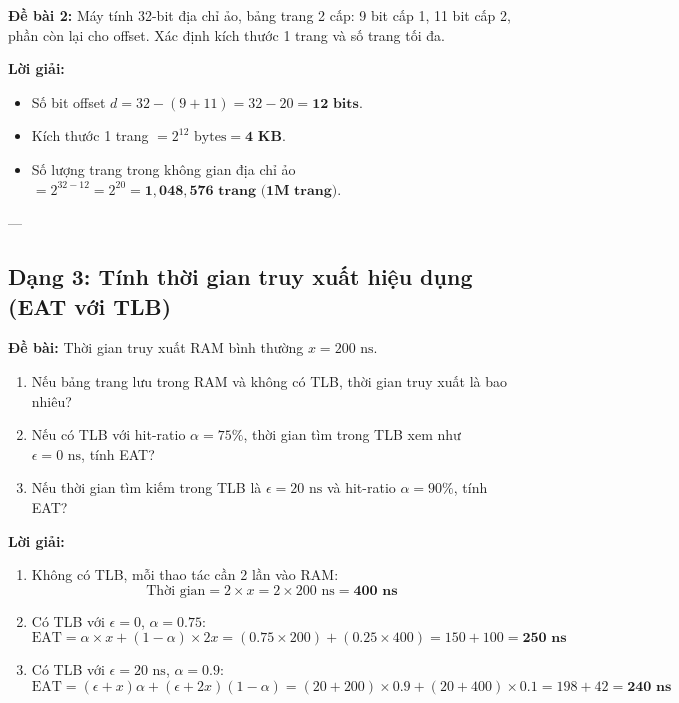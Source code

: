 \documentclass[11pt,a4paper]{article}
\begin{document}
\begin{examplebox}
\textbf{Đề bài 2:} Máy tính 32-bit địa chỉ ảo, bảng trang 2 cấp: 9 bit cấp 1, 11 bit cấp 2, phần còn lại cho offset. Xác định kích thước 1 trang và số trang tối đa.
\end{examplebox}
\textbf{Lời giải:}
\begin{itemize}[noitemsep]
    \item Số bit offset $d = 32 - (9 + 11) = 32 - 20 = \mathbf{12\text{ bits}}$.
    \item Kích thước 1 trang $= 2^{12}\text{ bytes} = \mathbf{4\text{ KB}}$.
    \item Số lượng trang trong không gian địa chỉ ảo $= 2^{32 - 12} = 2^{20} = \mathbf{1,048,576\text{ trang (1M trang)}}$.
\end{itemize}

---

\subsection{Dạng 3: Tính thời gian truy xuất hiệu dụng (EAT với TLB)}

\begin{examplebox}
\textbf{Đề bài:} Thời gian truy xuất RAM bình thường $x = 200\text{ ns}$.
\begin{enumerate}[noitemsep]
    \item[a.] Nếu bảng trang lưu trong RAM và không có TLB, thời gian truy xuất là bao nhiêu?
    \item[b.] Nếu có TLB với hit-ratio $\alpha = 75\%$, thời gian tìm trong TLB xem như $\epsilon = 0\text{ ns}$, tính EAT?
    \item[c.] Nếu thời gian tìm kiếm trong TLB là $\epsilon = 20\text{ ns}$ và hit-ratio $\alpha = 90\%$, tính EAT?
\end{enumerate}
\end{examplebox}

\textbf{Lời giải:}
\begin{enumerate}
    \item[a.] Không có TLB, mỗi thao tác cần 2 lần vào RAM:
    $$\text{Thời gian} = 2 \times x = 2 \times 200\text{ ns} = \mathbf{400\text{ ns}}$$
    \item[b.] Có TLB với $\epsilon = 0$, $\alpha = 0.75$:
    $$\text{EAT} = \alpha \times x + (1 - \alpha) \times 2x = (0.75 \times 200) + (0.25 \times 400) = 150 + 100 = \mathbf{250\text{ ns}}$$
    \item[c.] Có TLB với $\epsilon = 20\text{ ns}$, $\alpha = 0.9$:
    $$\text{EAT} = (\epsilon + x)\alpha + (\epsilon + 2x)(1 - \alpha) = (20 + 200) \times 0.9 + (20 + 400) \times 0.1 = 198 + 42 = \mathbf{240\text{ ns}}$$
\end{enumerate}
\end{document}
